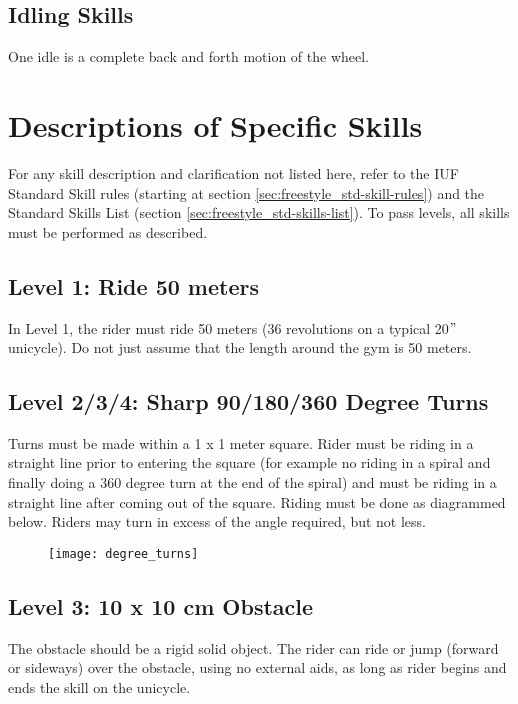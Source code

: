 \subsection{Idling Skills}
One idle is a complete back and forth motion of the wheel.

\section{Descriptions of Specific Skills}
For any skill description and clarification not listed here, refer to the IUF Standard Skill rules (starting at section \ref{sec:freestyle_std-skill-rules}) and
the Standard Skills List (section \ref{sec:freestyle_std-skills-list}).
To pass levels, all skills must be performed as described.

\subsection{Level 1: Ride 50 meters}
In Level 1, the rider must ride 50 meters (36 revolutions on a typical 20$"$ unicycle).
Do not just assume that the length around the gym is 50 meters.

\subsection{Level 2/3/4: Sharp 90/180/360 Degree Turns}
Turns must be made within a 1 x 1 meter square.
Rider must be riding in a straight line prior to entering the square (for example no riding in a spiral and finally doing a 360 degree turn at the end of the spiral) and must be riding in a straight line after coming out of the square.
Riding must be done as diagrammed below.
Riders may turn in excess of the angle required, but not less.

\begin{figure}[h]
\begin{center}
\texttt{[image: degree\_turns]}
\end{center}
\vspace{-20pt}
\vspace{-10pt}
\end{figure}
 
\subsection{Level 3: 10 x 10 cm Obstacle}
The obstacle should be a rigid solid object.
The rider can ride or jump (forward or sideways) over the obstacle, using no external aids, as long as rider begins and ends the skill on the unicycle.

